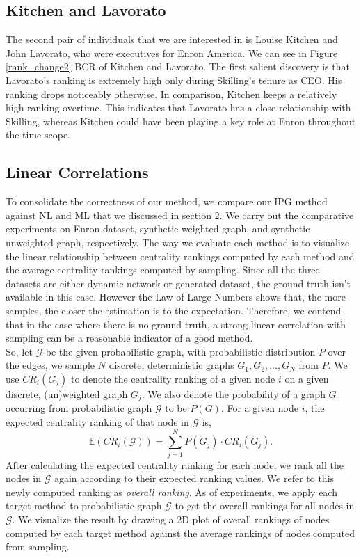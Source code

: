 \documentclass[\main/thesis.tex]{subfiles}
\begin{document}
\subsection*{Kitchen and Lavorato}
The second pair of individuals that we are interested in is Louise Kitchen and John Lavorato, who were executives for Enron America. We can see in Figure \ref{rank_change2} BCR of Kitchen and Lavorato. The first salient discovery is that Lavorato's ranking is extremely high only during Skilling's tenure as CEO. His ranking drops noticeably otherwise. In comparison, Kitchen keeps a relatively high ranking overtime. This indicates that Lavorato has a close relationship with Skilling, whereas Kitchen could have been playing a key role at Enron throughout the time scope.

\subsection{Linear Correlations}
To consolidate the correctness of our method, we compare our IPG method against NL and ML that we discussed in section 2. We carry out the comparative experiments on Enron dataset, synthetic weighted graph, and synthetic unweighted graph, respectively. The way we evaluate each method is to visualize the linear relationship between centrality rankings computed by each method and the average centrality rankings computed by sampling. Since all the three datasets are either dynamic network or generated dataset, the ground truth isn't available in this case. However the Law of Large Numbers shows that, the more samples, the closer the estimation is to the expectation. 
Therefore, we contend that in the case where there is no ground truth, a strong linear correlation with sampling can be a reasonable indicator of a good method. \\
So, let $\mathcal{G}$ be the given probabilistic graph, with probabilistic distribution $P$ over the edges, we sample $N$ discrete, deterministic graphs $G_1, G_2, ..., G_N$ from $P$. We use $CR_{i}(G_{j})$ to denote the centrality ranking of a given node $i$ on a given discrete, (un)weighted graph $G_{j}$. We also denote the probability of a graph $G$ occurring from probabilistic graph $\mathcal{G}$ to be $P(G)$. For a given node $i$, the expected centrality ranking of that node in $\mathcal{G}$ is,
\begin{equation}
\mathbb{E}(CR_{i}(\mathcal{G})) = \sum_{j=1}^{N}{P(G_j)}\cdot CR_{i}(G_j).
\end{equation}
After calculating the expected centrality ranking for each node, we rank all the nodes in $\mathcal{G}$ again according to their expected ranking values. We refer to this newly computed ranking as \textit{overall ranking}. As of experiments, we apply each target method to probabilistic graph $\mathcal{G}$ to get the overall rankings for all nodes in $\mathcal{G}$. We visualize the result by drawing a 2D plot of overall rankings of nodes computed by each target method against the average rankings of nodes computed from sampling. 
\end{document}
